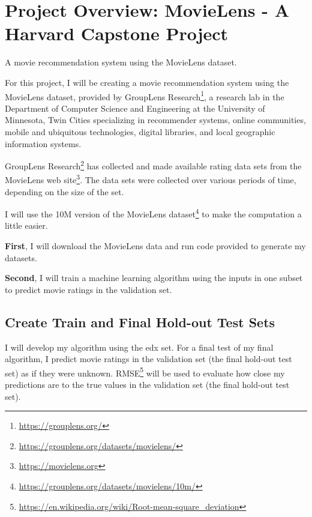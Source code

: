 \documentclass[
]{article}
\DeclareRobustCommand{\href}[2]{#2\footnote{\url{#1}}}
\begin{document}
\renewcommand{\listequationsname}{}

\listofequations
\clearpage

\newpage


\hypertarget{project-overview-movielens---a-harvard-capstone-project}{%
\section{Project Overview: MovieLens - A Harvard Capstone
Project}\label{project-overview-movielens---a-harvard-capstone-project}}

A movie recommendation system using the MovieLens dataset.

For this project, I will be creating a movie recommendation system using
the MovieLens dataset, provided by
\href{https://grouplens.org/}{GroupLens Research}, a research lab in the
Department of Computer Science and Engineering at the University of
Minnesota, Twin Cities specializing in recommender systems, online
communities, mobile and ubiquitous technologies, digital libraries, and
local geographic information systems.

\href{https://grouplens.org/datasets/movielens/}{GroupLens Research} has
collected and made available rating data sets from the
\href{https://movielens.org}{MovieLens web site}. The data sets were
collected over various periods of time, depending on the size of the
set.

I will use the \href{https://grouplens.org/datasets/movielens/10m/}{10M
version of the MovieLens dataset} to make the computation a little
easier.

\textbf{First}, I will download the MovieLens data and run code provided
to generate my datasets.

\textbf{Second}, I will train a machine learning algorithm using the
inputs in one subset to predict movie ratings in the validation set.

\hypertarget{create-train-and-final-hold-out-test-sets}{%
\subsection{Create Train and Final Hold-out Test
Sets}\label{create-train-and-final-hold-out-test-sets}}

I will develop my algorithm using the edx set. For a final test of my
final algorithm, I predict movie ratings in the validation set (the
final hold-out test set) as if they were unknown.
\href{https://en.wikipedia.org/wiki/Root-mean-square_deviation}{RMSE}
will be used to evaluate how close my predictions are to the true values
in the validation set (the final hold-out test set).
\end{document}
